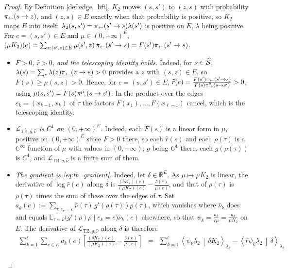 \begin{proof}
By Definition \ref{def:edge_lift}, $K_2$ moves $(s,s')$ to $(z,s)$ with probability $\pi_{\leftarrow}(s\rightarrow z)$, and $(z,s)\in E$ exactly when that probability is positive, so $K_2$ maps $E$ into itself; $\lambda_2(s,s')=\pi_{\leftarrow}(s'\rightarrow s)\lambda(s')$ is positive on $E$, $\lambda$ being positive. For $e=(s,s')\in E$ and $\mu\in(0,+\infty)^E$, $(\mu K_2)(e)=\sum_{z:(s',z)\in E}\mu(s',z)\,\pi_{\leftarrow}(s'\rightarrow s)=F(s')\pi_{\leftarrow}(s'\rightarrow s)$.
\begin{itemize}
    \item \emph{$F>0$, $\widehat r>0$, and the telescoping identity holds.} Indeed, for $s\in\widehat{\mathcal S}$, $\lambda(s)=\sum_z\lambda(z)\pi_{\leftarrow}(z\rightarrow s)>0$ provides a $z$ with $(s,z)\in E$, so $F(s)\geq\mu(s,z)>0$. Hence, for $e=(s,s')\in E$, $\widehat r(e)=\frac{F(s')\pi_{\leftarrow}(s'\rightarrow s)}{F(s)\pi_{\rightarrow}^\mu(s\rightarrow s')}>0$, using $\mu(s,s')=F(s)\pi_{\rightarrow}^\mu(s\rightarrow s')$. In the product over the edges $e_k=(x_{k-1},x_k)$ of $\tau$ the factors $F(x_1),\dots,F(x_{\ell-1})$ cancel, which is the telescoping identity.
    \item \emph{$\mathcal L_{\mathrm{TB},g,\widehat\nu}$ is $C^1$ on $(0,+\infty)^E$.} Indeed, each $F(s)$ is a linear form in $\mu$, positive on $(0,+\infty)^E$ since $F>0$ there, so each $\widehat r(e)$ and each $\rho(\tau)$ is a $C^\infty$ function of $\mu$ with values in $(0,+\infty)$; $g$ being $C^1$ there, each $g(\rho(\tau))$ is $C^1$, and $\mathcal L_{\mathrm{TB},g,\widehat\nu}$ is a finite sum of them.
    \item \emph{The gradient is \eqref{eq:tb_gradient}.} Indeed, let $\delta\in\mathbb R^E$. As $\mu\mapsto\mu K_2$ is linear, the derivative of $\log\widehat r(e)$ along $\delta$ is $\frac{(\delta K_2)(e)}{(\mu K_2)(e)}-\frac{\delta(e)}{\mu(e)}$, and that of $\rho(\tau)$ is $\rho(\tau)$ times the sum of these over the edges of $\tau$. Set $a_k(e):=\sum_{\tau:e_k=e}\widehat\nu(\tau)\,g'(\rho(\tau))\rho(\tau)$, which vanishes where $\widehat\nu_k$ does and equals $\mathbb E_{\tau\sim\widehat\nu}\bigl(g'(\rho)\rho\mid e_k=e\bigr)\widehat\nu_k(e)$ elsewhere, so that $\psi_k=\frac{a_k}{\widehat r\mu}=\frac{a_k}{\mu K_2}$ on $E$. The derivative of $\mathcal L_{\mathrm{TB},g,\widehat\nu}$ along $\delta$ is therefore
\begin{eqnarray}
    \sum_{k=1}^\ell\sum_{e\in E}a_k(e)\left[\frac{(\delta K_2)(e)}{(\mu K_2)(e)}-\frac{\delta(e)}{\mu(e)}\right]
    &=& \sum_{k=1}^\ell \left\langle \psi_k\lambda_2 \,\middle|\, \delta K_2\right\rangle_{\lambda_2} - \left\langle \widehat r\psi_k\lambda_2 \,\middle|\, \delta\right\rangle_{\lambda_2} \nonumber \\

\end{eqnarray}
\end{itemize}
\end{proof}
